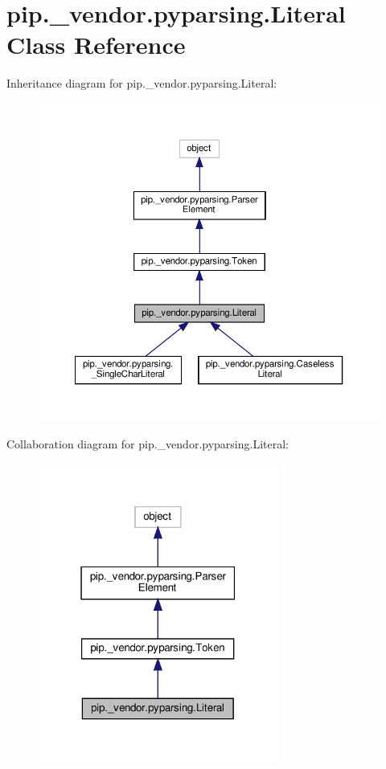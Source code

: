 \hypertarget{classpip_1_1__vendor_1_1pyparsing_1_1Literal}{}\section{pip.\+\_\+vendor.\+pyparsing.\+Literal Class Reference}
\label{classpip_1_1__vendor_1_1pyparsing_1_1Literal}


Inheritance diagram for pip.\+\_\+vendor.\+pyparsing.\+Literal\+:
\nopagebreak
\begin{figure}[H]
\begin{center}
\leavevmode
\includegraphics[width=350pt]{classpip_1_1__vendor_1_1pyparsing_1_1Literal__inherit__graph}
\end{center}
\end{figure}


Collaboration diagram for pip.\+\_\+vendor.\+pyparsing.\+Literal\+:
\nopagebreak
\begin{figure}[H]
\begin{center}
\leavevmode
\includegraphics[width=223pt]{classpip_1_1__vendor_1_1pyparsing_1_1Literal__coll__graph}
\end{center}
\end{figure}
